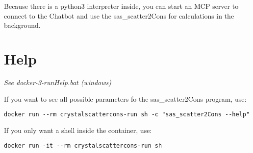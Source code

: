 \documentclass[11pt]{article} %
\begin{document}
Because there is a python3 interpreter inside, you can start an MCP server to connect to the Chatbot and use the sas\_scatter2Cons for calculations in the background.


\section{Help}

\centerline{\it See docker-3-runHelp.bat (windows)}

If you want to see all possible parameters fo the sas\_scatter2Cons program, use:
\begin{lstlisting}[frame=single]
docker run --rm crystalscattercons-run sh -c "sas_scatter2Cons --help"
\end{lstlisting}

If you only want a shell inside the container, use:
\begin{lstlisting}[frame=single]
docker run -it --rm crystalscattercons-run sh
\end{lstlisting}
\end{document}
